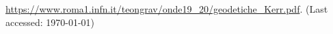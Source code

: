 \documentclass[a4paper,pdftex,10pt]{article}
\begin{document}
\clearpage
\begin{thebibliography}{99}
  \url{https://www.roma1.infn.it/teongrav/onde19_20/geodetiche_Kerr.pdf}. (Last accessed: \today)
\end{thebibliography}












% 
% 

\end{document}
